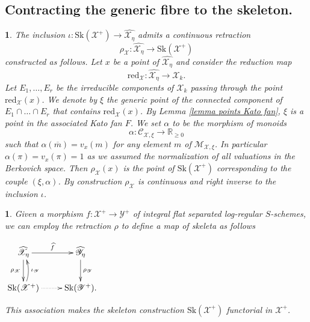 \documentclass{amsart}%
\numberwithin{equation}{subsection}
\theoremstyle{plain2}
\theoremstyle{definition2}
\theoremstyle{stepstyle}
\theoremstyle{point}
\theoremstyle{subpoint}
\newtheorem{subpoint}[equation]{}%
\newcommand{\spa}[1]{\begin{subpoint}#1\end{subpoint}}           %
\newcommand{\R}{\ensuremath{\mathbb{R}}}
\newcommand{\cX}{\ensuremath{\mathscr{X}}}
\newcommand{\caM}{\ensuremath{\mathcal{M}}}
\newcommand{\caC}{\ensuremath{\mathcal{C}}}
\newcommand{\cY}{\ensuremath{\mathscr{Y}}}
\renewcommand{\R}{\ensuremath{\mathbb{R}}}
\renewcommand{\cY}{\ensuremath{\mathscr{Y}}}
\newcommand{\redu}{\mathrm{red}}
\newcommand{\Sk}{\mathrm{Sk}}
\begin{document}
\subsection{Contracting the generic fibre to the skeleton.}
\spa{The inclusion $\iota: \Sk(\cX^+) \rightarrow \widehat{\cX_{\eta}}$ admits a continuous retraction $$\rho_\cX: \widehat{\cX_{\eta}} \rightarrow \Sk(\cX^+)$$ constructed as follows. Let $x$ be a point of $\widehat{\cX_{\eta}}$ and consider the reduction map $$\redu_{\cX}:\widehat{\cX_{\eta}} \rightarrow \cX_k.$$ Let $E_1, \ldots, E_r$ be the irreducible components of $\cX_k$ passing through the point $\redu_\cX(x)$. We denote by $\xi$ the generic point of the connected component of $E_1 \cap \ldots \cap E_r$ that contains $\redu_\cX(x)$. By Lemma \ref{lemma points Kato fan}, $\xi$ is a point in the associated Kato fan $F$. We set $\alpha$ to be the morphism of monoids $$\alpha: \caC_{\cX,\xi} \rightarrow \R_{\geqslant 0 }$$ such that $\alpha(\overline{m}) = v_x(m)$ for any element $m$ of $\caM_{\cX,\xi}$. In particular $\alpha(\pi)= v_x(\pi)=1$ as we assumed the normalization of all valuations in the Berkovich space. Then $\rho_\cX(x)$ is the point of $\Sk(\cX^+)$ corresponding to the couple $(\xi,\alpha)$. By construction $\rho_\cX$ is continuous and right inverse to the inclusion $\iota$. 
}

\spa{Given a morphism $f: \cX^+ \rightarrow \cY^+$ of integral flat separated log-regular $S$-schemes, we can employ the retraction $\rho$ to define a map of skeleta as follows
\begin{center}
$\begin{gathered}
\xymatrixcolsep{2pc} \xymatrix{
 \widehat{\cX_{\eta}} \ar[r]^-{\widehat{f}} \ar[d]_{\rho_\cX} & \widehat{\cY_{\eta}} \ar[d]^{\rho_\cY}\\
  \Sk(\cX^+) \ar@{.>}[r]^{} \ar@/_/[u]_-{\iota_\cY}  & \Sk(\cY^+).
}
\end{gathered}$\end{center} This association makes the skeleton construction $\Sk(\cX^+)$ functorial in $\cX^+$.
}
\end{document}
